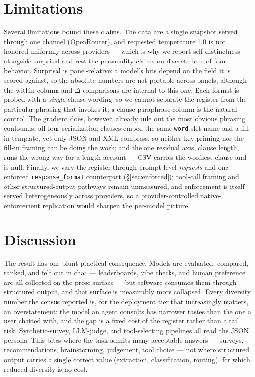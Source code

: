 \documentclass[11pt]{article}
\begin{document}
\section{Limitations}
\label{sec:limitations}
Several limitations bound these claims. The data are a single snapshot served through one
channel (OpenRouter), and requested temperature 1.0 is not honored uniformly across providers
--- which is why we report self-distinctness alongside surprisal and rest the personality claims
on discrete four-of-four behavior. Surprisal is panel-relative: a model's bits depend on the
field it is scored against, so the absolute numbers are not portable across panels, although the
within-column and $\Delta$ comparisons are internal to this one. Each format is probed with a
\emph{single} clause wording, so we cannot separate the register from the particular phrasing
that invokes it; a clause-paraphrase column is the natural control. The gradient does, however,
already rule out the most obvious phrasing confounds: all four serialization clauses embed the
same \texttt{word} slot name and a fill-in template, yet only JSON and XML compress, so neither
key-priming nor the fill-in framing can be doing the work; and the one residual axis, clause
length, runs the wrong way for a length account --- CSV carries the wordiest clause and is null. Finally, we vary the register
through prompt-level \emph{requests} and one enforced \texttt{response\_format} counterpart
(\S\ref{sec:enforced}); tool-call framing and other structured-output pathways remain unmeasured,
and enforcement is itself served heterogeneously across providers, so a provider-controlled
native-enforcement replication would sharpen the per-model picture.

\section{Discussion}
\label{sec:discussion}
The result has one blunt practical consequence. Models are evaluated, compared, ranked, and felt
out in chat --- leaderboards, vibe checks, and human preference are all collected on the prose
surface --- but software consumes them through structured output, and that surface is measurably
more collapsed. Every diversity number the census reported is, for the deployment tier that
increasingly matters, an overstatement: the model an agent consults has narrower tastes than the
one a user chatted with, and the gap is a fixed cost of the register rather than a tail risk.
Synthetic-survey, LLM-judge, and tool-selecting pipelines all read the JSON persona. This bites
where the task admits many acceptable answers --- surveys, recommendations, brainstorming,
judgement, tool choice --- not where structured output carries a single correct value
(extraction, classification, routing), for which reduced diversity is no cost.
\end{document}
